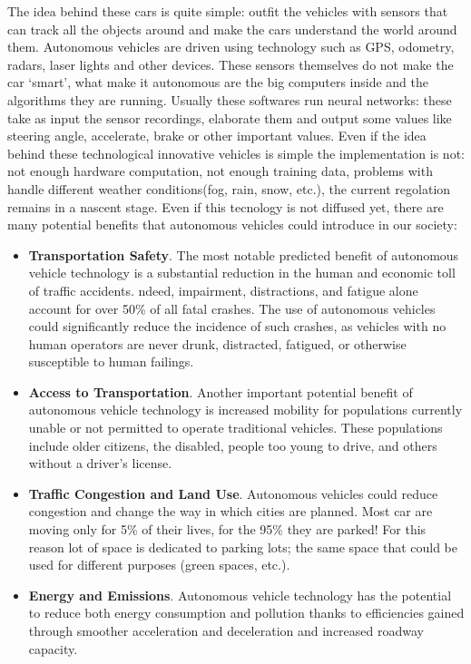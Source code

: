\documentclass[14pt]{extarticle}
\def\ss{\vspace{25pt}}
\def\pp{\vspace{10pt}\newline}
\def\ppn{\vspace{10pt}}
\begin{document}
\begin{flushleft}
\ppn
The idea behind these cars is quite simple: outfit the vehicles with sensors that can track all the objects around and make the cars understand the world around them. Autonomous vehicles are driven using technology such as GPS, odometry, radars, laser lights and other devices\cite{AVlevels2}.
 These sensors themselves do not make the car ‘smart’, what make it autonomous are the big computers inside and the algorithms they are running. Usually these softwares run neural networks: these take as input the sensor recordings, elaborate them and output some values like steering angle, accelerate, brake or other important values.
 Even if the idea behind these technological innovative vehicles is simple the implementation is not: not enough hardware computation, not enough training data, problems with handle different weather conditions(fog, rain, snow, etc.),  the current regolation remains in a nascent stage.
 \pp
 Even if this tecnology is not diffused yet, there are many potential benefits that autonomous vehicles could introduce in our society:
 \begin{itemize}
 \item \textbf{Transportation Safety}. The most notable predicted benefit of autonomous vehicle technology is a substantial reduction in the human and economic toll of traffic accidents. ndeed,  impairment,  distractions,  and  fatigue  alone  account  for over 50\% of all fatal crashes. The use of autonomous vehicles could significantly reduce the incidence of such crashes, as vehicles with no human operators  are  never  drunk,  distracted,  fatigued,  or  otherwise  susceptible  to human failings.
\item \textbf{Access to Transportation}. Another important potential benefit of autonomous vehicle technology  is  increased  mobility  for  populations  currently  unable  or  not 
permitted  to  operate  traditional  vehicles. These  populations  include  older 
citizens, the disabled, people too young to drive, and others without a driver’s 
license.
\item \textbf{Traffic Congestion and Land Use}. Autonomous vehicles could reduce congestion and change the way in which cities are planned. Most car are moving only for 5\% of their lives, for the 95\% they are parked\cite{AVparking}! For this reason lot of space is dedicated to parking lots; the same space that could be used for different purposes (green spaces, etc.).
\item \textbf{Energy and Emissions}. Autonomous vehicle technology has the potential to reduce both energy consumption and pollution thanks to efficiencies gained through smoother acceleration and deceleration and  increased  roadway capacity.\cite{AVbenefit}
 \end{itemize}

	\ss
\end{flushleft}
\end{document}
